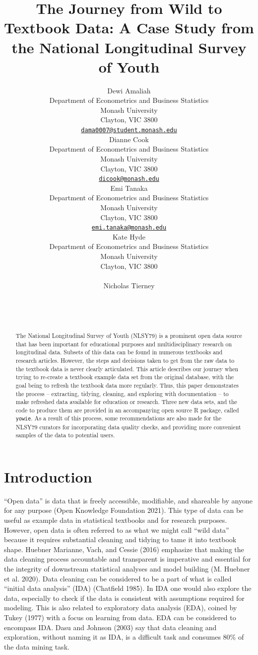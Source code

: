 \documentclass{article}
\title{The Journey from Wild to Textbook Data: A Case Study from the National Longitudinal Survey of Youth}
\author{
    Dewi Amaliah
   \\
    Department of Econometrics and Business Statistics \\
    Monash University \\
  Clayton, VIC 3800 \\
  \texttt{\href{mailto:dama0007@student.monash.edu}{\nolinkurl{dama0007@student.monash.edu}}} \\
   \And
    Dianne Cook
   \\
    Department of Econometrics and Business Statistics \\
    Monash University \\
  Clayton, VIC 3800 \\
  \texttt{\href{mailto:dicook@monash.edu}{\nolinkurl{dicook@monash.edu}}} \\
   \And
    Emi Tanaka
   \\
    Department of Econometrics and Business Statistics \\
    Monash University \\
  Clayton, VIC 3800 \\
  \texttt{\href{mailto:emi.tanaka@monash.edu}{\nolinkurl{emi.tanaka@monash.edu}}} \\
   \And
    Kate Hyde
   \\
    Department of Econometrics and Business Statistics \\
    Monash University \\
  Clayton, VIC 3800 \\
  \texttt{} \\
   \And
    Nicholas Tierney
   \\
     \\
   \\
  \texttt{} \\
  }
\begin{document}
\maketitle

\def\tightlist{}


\begin{abstract}
The National Longitudinal Survey of Youth (NLSY79) is a prominent open data source that has been important for educational purposes and multidisciplinary research on longitudinal data. Subsets of this data can be found in numerous textbooks and research articles. However, the steps and decisions taken to get from the raw data to the textbook data is never clearly articulated. This article describes our journey when trying to re-create a textbook example data set from the original database, with the goal being to refresh the textbook data more regularly. Thus, this paper demonstrates the process -- extracting, tidying, cleaning, and exploring with documentation -- to make refreshed data available for education or research. Three new data sets, and the code to produce them are provided in an accompanying open source R package, called \texttt{yowie}. As a result of this process, some recommendations are also made for the NLSY79 curators for incorporating data quality checks, and providing more convenient samples of the data to potential users.
\end{abstract}


\hypertarget{intro}{%
\section{Introduction}\label{intro}}

``Open data'' is data that is freely accessible, modifiable, and shareable by anyone for any purpose (Open Knowledge Foundation 2021). This type of data can be useful as example data in statistical textbooks and for research purposes. However, open data is often referred to as what we might call ``wild data'' because it requires substantial cleaning and tidying to tame it into textbook shape. Huebner Marianne, Vach, and Cessie (2016) emphasize that making the data cleaning process accountable and transparent is imperative and essential for the integrity of downstream statistical analyses and model building (M. Huebner et al. 2020).
Data cleaning can be considered to be a part of what is called ``initial data analysis'' (IDA) (Chatfield 1985). In IDA one would also explore the data, especially to check if the data is consistent with assumptions required for modeling. This is also related to exploratory data analysis (EDA), coined by Tukey (1977) with a focus on learning from data. EDA can be considered to encompass IDA. Dasu and Johnson (2003) say that data cleaning and exploration, without naming it as IDA, is a difficult task and consumes 80\% of the data mining task.
\end{document}
